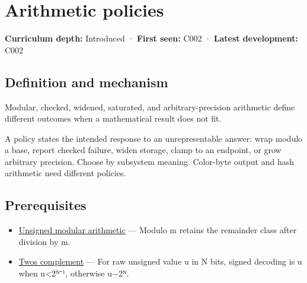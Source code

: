 \hypertarget{appendix-2ed044358b82}{}\label{referencestart:appendix-2ed044358b82}
\section{Arithmetic policies}\label{appendix-2ed044358b82-arithmetic-policies}

\hypertarget{appendix-2ed044358b82-arithmetic-policies}{}

\textbf{Curriculum depth:} Introduced · \textbf{First seen:} C002 · \textbf{Latest development:} C002

\begin{allmightroledefinition}

\subsection{Definition and mechanism}\label{appendix-2ed044358b82-definition-and-mechanism}

\hypertarget{appendix-2ed044358b82-definition-and-mechanism}{}

Modular, checked, widened, saturated, and arbitrary-precision arithmetic define different outcomes when a mathematical result does not fit.

\end{allmightroledefinition}

A policy states the intended response to an unrepresentable answer: wrap modulo a base, report checked failure, widen storage, clamp to an endpoint, or grow arbitrary precision. Choose by subsystem meaning. Color-byte output and hash arithmetic need different policies.

\subsection{Prerequisites}\label{appendix-2ed044358b82-prerequisites}

\hypertarget{appendix-2ed044358b82-prerequisites}{}

\begin{itemize}
\tightlist
\item
  \hyperref[appendix-c99977d88b33]{Unsigned modular arithmetic} --- Modulo m retains the remainder class after division by m.
\item
  \hyperref[appendix-4fbc03d20829]{Two\textquotesingle s complement} --- For raw unsigned value u in N bits, signed decoding is u when u\textless2ᴺ⁻¹, otherwise u−2ᴺ.
\end{itemize}

